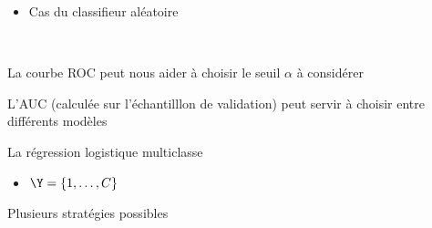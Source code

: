 \documentclass[10pt]{beamer}
\newcommand{\hsp}{\hspace*{1em}}
\begin{document}
\begin{frame}
		\begin{itemize}
		\item 	Cas du classifieur aléatoire \\[24em]
	\end{itemize}
\end{frame}
	
	
	\begin{frame}
 \hsp \\[24em]
		
	\end{frame}
	
	
	
	
	\begin{frame}
La courbe ROC peut nous aider à choisir le seuil $\alpha$ à considérer \\[24em]
		
	\end{frame}
	



\begin{frame}
	L'AUC (calculée sur l'échantilllon de validation) peut servir à choisir entre différents modèles \\[24em]
	
\end{frame}





\begin{frame}{La régression logistique multiclasse}
\begin{itemize}
	\item $\Y=\{1,\dots, C\}$\\[1em]
\end{itemize}
	
Plusieurs stratégies possibles\\[1em]

\vspace*{22em}

	
	
\end{frame}
\end{document}
